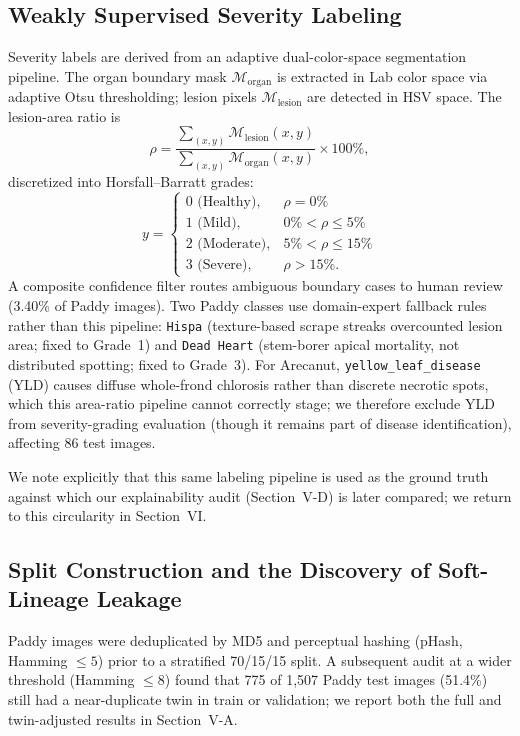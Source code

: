 \documentclass[conference]{IEEEtran}
\begin{document}
\subsection{Weakly Supervised Severity Labeling}
Severity labels are derived from an adaptive dual-color-space segmentation pipeline. The organ boundary mask $\mathcal{M}_{\text{organ}}$ is extracted in Lab color space via adaptive Otsu thresholding; lesion pixels $\mathcal{M}_{\text{lesion}}$ are detected in HSV space. The lesion-area ratio is
\begin{equation}
\rho = \frac{\sum_{(x,y)} \mathcal{M}_{\text{lesion}}(x,y)}{\sum_{(x,y)} \mathcal{M}_{\text{organ}}(x,y)} \times 100\%,
\label{eq:ratio}
\end{equation}
discretized into Horsfall--Barratt grades:
\begin{equation}
y = \begin{cases}
0 \text{ (Healthy)}, & \rho = 0\% \\
1 \text{ (Mild)}, & 0\% < \rho \le 5\% \\
2 \text{ (Moderate)}, & 5\% < \rho \le 15\% \\
3 \text{ (Severe)}, & \rho > 15\%.
\end{cases}
\label{eq:hb_scale}
\end{equation}
A composite confidence filter routes ambiguous boundary cases to human review (3.40\% of Paddy images). Two Paddy classes use domain-expert fallback rules rather than this pipeline: \texttt{Hispa} (texture-based scrape streaks overcounted lesion area; fixed to Grade~1) and \texttt{Dead Heart} (stem-borer apical mortality, not distributed spotting; fixed to Grade~3). For Arecanut, \texttt{yellow\_leaf\_disease} (YLD) causes diffuse whole-frond chlorosis rather than discrete necrotic spots, which this area-ratio pipeline cannot correctly stage; we therefore exclude YLD from severity-grading evaluation (though it remains part of disease identification), affecting 86 test images.

We note explicitly that this same labeling pipeline is used as the ground truth against which our explainability audit (Section~V-D) is later compared; we return to this circularity in Section~VI.

\subsection{Split Construction and the Discovery of Soft-Lineage Leakage}
\label{sec:leakage}
Paddy images were deduplicated by MD5 and perceptual hashing (pHash, Hamming $\le 5$) prior to a stratified 70/15/15 split. A subsequent audit at a wider threshold (Hamming $\le 8$) found that 775 of 1,507 Paddy test images (51.4\%) still had a near-duplicate twin in train or validation; we report both the full and twin-adjusted results in Section~V-A.
\end{document}
